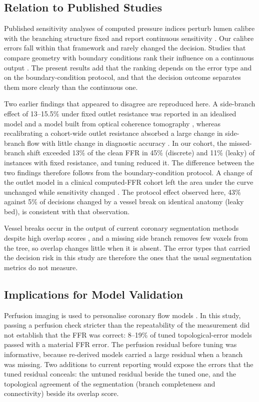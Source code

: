 \documentclass[journal]{IEEEtran}
\begin{document}
\subsection{Relation to Published Studies}
Published sensitivity analyses of computed pressure indices perturb lumen calibre with the branching structure fixed and report
continuous sensitivity \cite{sankaran2015tmi,sankaran2015cmame,fernandez2024,dalmaso2025}. Our calibre errors fall within that framework and rarely changed the decision. Studies that compare geometry with boundary conditions rank their influence on a continuous output
\cite{sankaran2016,tanade2022,korte2023}. The present results add that the ranking depends on the error type and on
the boundary-condition protocol, and that the decision outcome separates them more clearly than the continuous
one.

Two earlier findings that appeared to disagree are reproduced here. A side-branch effect of 13--15.5\% under fixed outlet resistance was reported in an idealised model and a model built from optical coherence tomography \cite{gamage2022}, whereas recalibrating a cohort-wide outlet resistance absorbed a large change in side-branch flow with little change in diagnostic accuracy \cite{gosling2020}. In our cohort, the missed-branch shift exceeded 13\% of the clean FFR in 45\%
(discrete) and 11\% (leaky) of instances with fixed resistance, and tuning reduced it. The difference between the
two findings therefore follows from the boundary-condition protocol. A change of
the outlet model in a clinical computed-FFR cohort left the area under the curve unchanged while sensitivity
changed \cite{fossan2026}. The protocol effect observed here, 43\% against 5\% of decisions changed by a vessel break on identical anatomy (leaky bed), is consistent with that observation.

Vessel breaks occur in the output of current coronary segmentation methods despite high overlap scores \cite{bransby2026}, and a missing side branch removes few voxels from the tree, so overlap changes little when it is absent. The error types that carried the decision risk
in this study are therefore the ones that the usual segmentation metrics do not measure.

\subsection{Implications for Model Validation}
Perfusion imaging is used to personalise coronary flow models \cite{menon2024}. In this study, passing a
perfusion check stricter than the repeatability of the measurement did not establish that the FFR was correct:
8--19\% of tuned topological-error models passed with a material FFR error. The perfusion residual before tuning
was informative, because re-derived models carried a large residual when a branch was missing. Two additions to
current reporting would expose the errors that the tuned residual conceals: the untuned residual beside the tuned
one, and the topological agreement of the segmentation (branch completeness and connectivity) beside its overlap
score.
\end{document}

